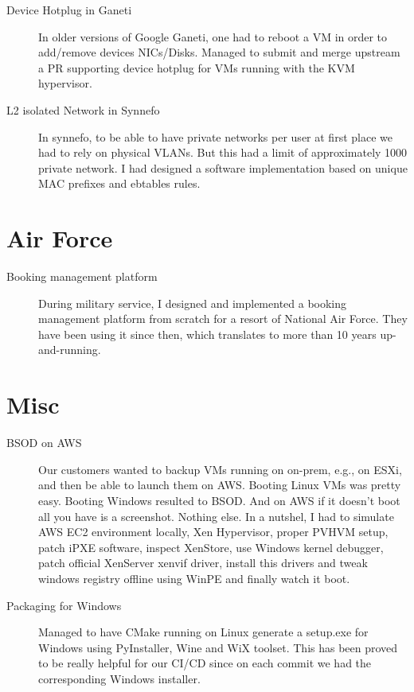 \documentclass[margin,centered]{res}
\let\footnote=\endnote
\begin{document}
\begin{resume}
\begin{description}
\item[Device Hotplug in Ganeti]
In older versions of Google Ganeti, one had to reboot a VM in order to
add/remove devices NICs/Disks. Managed to submit and merge upstream a PR
supporting device hotplug for VMs running with the KVM hypervisor.

\item[L2 isolated Network in Synnefo]
In synnefo, to be able to have private networks per user at first place we
had to rely on physical VLANs. But this had a limit of approximately 1000
private network. I had designed a software implementation based on unique MAC
prefixes and ebtables rules.
\end{description}

\section{\sc Air Force}

\begin{description}
\item[Booking management platform]
During military service, I designed and implemented a booking management
platform \footnote{https://github.com/dimara/keda} from scratch for a resort of
National Air Force. They have been using it since then, which translates to
more than 10 years up-and-running.
\end{description}

\section{\sc Misc}

\begin{description}
\item[BSOD on AWS]
Our customers wanted to backup VMs running on on-prem, e.g., on ESXi, and then
be able to launch them on AWS. Booting Linux VMs was pretty easy. Booting
Windows resulted to BSOD. And on AWS if it doesn't boot all you have is a
screenshot. Nothing else. In a nutshel, I had to simulate AWS EC2 environment
locally, Xen Hypervisor, proper PVHVM setup, patch iPXE software, inspect
XenStore, use Windows kernel debugger, patch official XenServer xenvif driver,
install this drivers and tweak windows registry offline using WinPE and
finally watch it boot.

\item[Packaging for Windows]
Managed to have CMake running on Linux generate a setup.exe for Windows using
PyInstaller, Wine and WiX toolset. This has been proved to be really helpful for
our CI/CD since on each commit we had the corresponding Windows installer.


\end{description}
\end{resume}
\end{document}
